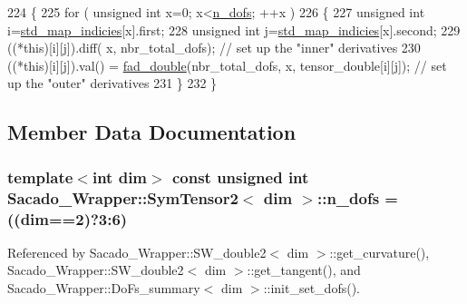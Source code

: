 \begin{DoxyCode}
224     \{
225          \textcolor{keywordflow}{for} ( \textcolor{keywordtype}{unsigned} \textcolor{keywordtype}{int} x=0; x<\hyperlink{classSacado__Wrapper_1_1SymTensor2_ad9d6542de5481e0d41bd1831cb0aeaff}{n\_dofs}; ++x )
226          \{
227             \textcolor{keywordtype}{unsigned} \textcolor{keywordtype}{int} i=\hyperlink{classSacado__Wrapper_1_1SymTensor2_a1c6b89438714315ae209f4687b687505}{std\_map\_indicies}[x].first;
228             \textcolor{keywordtype}{unsigned} \textcolor{keywordtype}{int} j=\hyperlink{classSacado__Wrapper_1_1SymTensor2_a1c6b89438714315ae209f4687b687505}{std\_map\_indicies}[x].second;
229             ((*this)[i][j]).diff( x, nbr\_total\_dofs);   \textcolor{comment}{// set up the "inner" derivatives}
230             ((*this)[i][j]).val() = \hyperlink{Sacado__Wrapper_8h_a868b94676739e612d9c95940e70892a9}{fad\_double}(nbr\_total\_dofs, x, tensor\_double[i][j]); \textcolor{comment}{// set up
       the "outer" derivatives}
231          \}
232     \}
\end{DoxyCode}


\subsection{Member Data Documentation}
\subsubsection[{\texorpdfstring{n\+\_\+dofs}{n_dofs}}]{\setlength{\rightskip}{0pt plus 5cm}template$<$int dim$>$ const unsigned {\bf int} {\bf Sacado\+\_\+\+Wrapper\+::\+Sym\+Tensor2}$<$ dim $>$\+::n\+\_\+dofs = ((dim==2)?3\+:6)\hspace{0.3cm}{\ttfamily [static]}}\hypertarget{classSacado__Wrapper_1_1SymTensor2_ad9d6542de5481e0d41bd1831cb0aeaff}{}\label{classSacado__Wrapper_1_1SymTensor2_ad9d6542de5481e0d41bd1831cb0aeaff}


Referenced by Sacado\+\_\+\+Wrapper\+::\+S\+W\+\_\+double2$<$ dim $>$\+::get\+\_\+curvature(), Sacado\+\_\+\+Wrapper\+::\+S\+W\+\_\+double2$<$ dim $>$\+::get\+\_\+tangent(), and Sacado\+\_\+\+Wrapper\+::\+Do\+Fs\+\_\+summary$<$ dim $>$\+::init\+\_\+set\+\_\+dofs().

